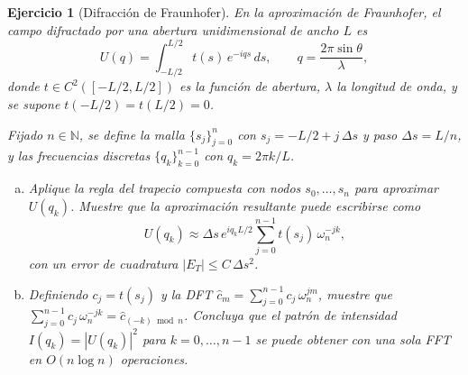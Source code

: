 \documentclass[12pt]{article}
\newtheorem{exercise}{Ejercicio}
\begin{document}
\begin{exercise}[Difracción de Fraunhofer]
En la aproximación de Fraunhofer, el campo difractado por una abertura unidimensional de ancho $L$ es
\[
U(q) = \int_{-L/2}^{L/2} t(s)\,e^{-i q s}\,ds, \qquad q = \frac{2\pi\sin\theta}{\lambda},
\]
donde $t\in C^2([-L/2,L/2])$ es la \emph{función de abertura}, $\lambda$ la longitud de onda, y se supone $t(-L/2)=t(L/2)=0$.

Fijado $n\in\mathbb{N}$, se define la malla $\{s_j\}_{j=0}^n$ con $s_j = -L/2 + j\,\Delta s$ y paso $\Delta s = L/n$, y las frecuencias discretas $\{q_k\}_{k=0}^{n-1}$ con $q_k = 2\pi k/L$.
\begin{enumerate}[(a)]
\item Aplique la regla del trapecio compuesta con nodos $s_0,\ldots,s_n$ para aproximar $U(q_k)$.  Muestre que la aproximación resultante puede escribirse como
\[
U(q_k) \approx \Delta s\,e^{iq_kL/2}\sum_{j=0}^{n-1} t(s_j)\,\omega_n^{-jk},
\]
con un error de cuadratura $|E_T|\le C\,\Delta s^2$.

\item Definiendo $c_j = t(s_j)$ y la DFT $\hat{c}_m = \sum_{j=0}^{n-1} c_j\,\omega_n^{jm}$, muestre que $\sum_{j=0}^{n-1} c_j\,\omega_n^{-jk} = \hat{c}_{(-k)\bmod n}$.  Concluya que el patrón de intensidad $I(q_k)=|U(q_k)|^2$ para $k=0,\ldots,n-1$ se puede obtener con una sola FFT en $O(n\log n)$ operaciones.
\end{enumerate}
\end{exercise}
\end{document}
